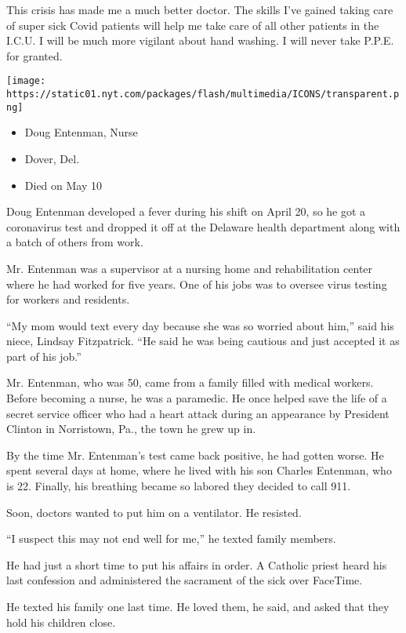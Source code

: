 This crisis has made me a much better doctor. The skills I've gained
taking care of super sick Covid patients will help me take care of all
other patients in the I.C.U. I will be much more vigilant about hand
washing. I will never take P.P.E. for granted.

\texttt{[image: https://static01.nyt.com/packages/flash/multimedia/ICONS/transparent.png]}

\begin{itemize}
\tightlist
\item
  Doug Entenman, Nurse
\item
  Dover, Del.
\item
  Died on May 10
\end{itemize}

Doug Entenman developed a fever during his shift on April 20, so he got
a coronavirus test and dropped it off at the Delaware health department
along with a batch of others from work.

Mr. Entenman was a supervisor at a nursing home and rehabilitation
center where he had worked for five years. One of his jobs was to
oversee virus testing for workers and residents.

``My mom would text every day because she was so worried about him,''
said his niece, Lindsay Fitzpatrick. ``He said he was being cautious and
just accepted it as part of his job.''

Mr. Entenman, who was 50, came from a family filled with medical
workers. Before becoming a nurse, he was a paramedic. He once helped
save the life of a secret service officer who had a heart attack during
an appearance by President Clinton in Norristown, Pa., the town he grew
up in.

By the time Mr. Entenman's test came back positive, he had gotten worse.
He spent several days at home, where he lived with his son Charles
Entenman, who is 22. Finally, his breathing became so labored they
decided to call 911.

Soon, doctors wanted to put him on a ventilator. He resisted.

``I suspect this may not end well for me,'' he texted family members.

He had just a short time to put his affairs in order. A Catholic priest
heard his last confession and administered the sacrament of the sick
over FaceTime.

He texted his family one last time. He loved them, he said, and asked
that they hold his children close.


